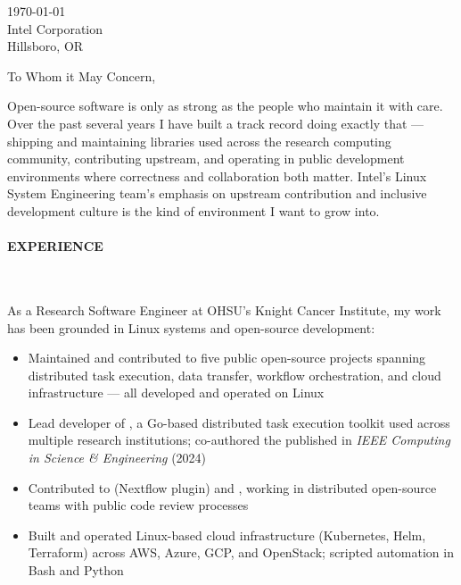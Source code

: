 



\textcolor{my-grey}{\dotfill}
\bigbreak

{\today}\\
Intel Corporation\\
Hillsboro, OR

\vspace*{2\baselineskip}

To Whom it May Concern,

\vspace*{\baselineskip}

Open-source software is only as strong as the people who maintain it with care. Over the past several years I have built a track record doing exactly that --- shipping and maintaining libraries used across the research computing community, contributing upstream, and operating in public development environments where correctness and collaboration both matter. Intel's Linux System Engineering team's emphasis on upstream contribution and inclusive development culture is the kind of environment I want to grow into.

\paragraph{EXPERIENCE}\

\vspace*{\baselineskip}

As a Research Software Engineer at OHSU's Knight Cancer Institute, my work has been grounded in Linux systems and open-source development:

\begin{itemize}

    \item Maintained and contributed to five public open-source projects spanning distributed task execution, data transfer, workflow orchestration, and cloud infrastructure --- all developed and operated on Linux

    \item Lead developer of , a Go-based distributed task execution toolkit used across multiple research institutions; co-authored the  published in \emph{IEEE Computing in Science \& Engineering} (2024)

    \item Contributed to  (Nextflow plugin) and , working in distributed open-source teams with public code review processes

    \item Built and operated Linux-based cloud infrastructure (Kubernetes, Helm, Terraform) across AWS, Azure, GCP, and OpenStack; scripted automation in Bash and Python

\end{itemize}

